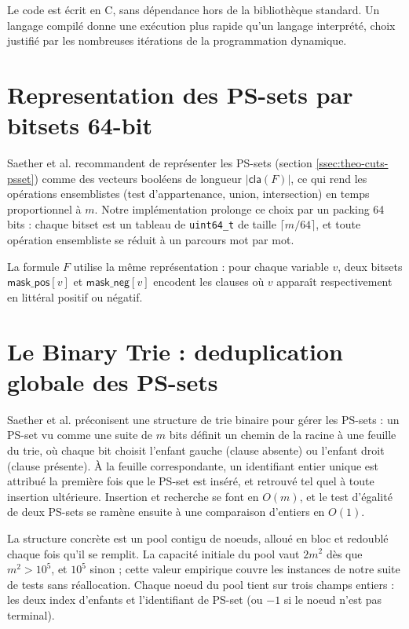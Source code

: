 \documentclass[11pt,a4paper]{report}
\theoremstyle{plain}
\theoremstyle{definition}
\begin{document}
Le code est écrit en C, sans dépendance hors de la bibliothèque
standard. Un langage compilé donne une exécution plus rapide qu'un
langage interprété, choix justifié par les nombreuses itérations de
la programmation dynamique.

\section{Representation des PS-sets par bitsets 64-bit}
\label{sec:impl-bitsets}

Saether et al. \cite{saether2015} recommandent de représenter les
PS-sets (section \ref{ssec:theo-cuts-psset}) comme des vecteurs
booléens de longueur $|\mathsf{cla}(F)|$, ce qui rend les opérations
ensemblistes (test d'appartenance, union, intersection) en temps
proportionnel à $m$. Notre implémentation
prolonge ce choix par un packing 64 bits : chaque bitset est un
tableau de \texttt{uint64\_t} de taille $\lceil m/64 \rceil$, et toute
opération ensembliste se réduit à un parcours mot par mot.

La formule $F$ utilise la même représentation : pour chaque variable
$v$, deux bitsets $\mathsf{mask\_pos}[v]$ et $\mathsf{mask\_neg}[v]$
encodent les clauses où $v$ apparaît respectivement en littéral
positif ou négatif.

\section{Le Binary Trie : deduplication globale des PS-sets}
\label{sec:impl-trie}

Saether et al. \cite{saether2015} préconisent une structure de trie
binaire pour gérer les PS-sets : un PS-set vu comme une suite de $m$
bits définit un chemin de la racine à une feuille du trie, où chaque
bit choisit l'enfant gauche (clause absente) ou l'enfant droit (clause
présente). À la feuille correspondante, un identifiant entier unique
est attribué la première fois que le PS-set est inséré, et retrouvé
tel quel à toute insertion ultérieure. Insertion et recherche se font
en $O(m)$, et le test d'égalité de deux PS-sets se ramène ensuite à
une comparaison d'entiers en $O(1)$.

La structure concrète est un pool contigu de noeuds, alloué en bloc
et redoublé chaque fois qu'il se remplit. La capacité initiale du
pool vaut $2 m^2$ dès que $m^2 > 10^5$, et $10^5$ sinon ; cette
valeur empirique couvre les instances de notre suite de tests sans
réallocation. Chaque noeud
du pool tient sur trois champs entiers : les deux index d'enfants et
l'identifiant de PS-set (ou $-1$ si le noeud n'est pas terminal).
\end{document}
